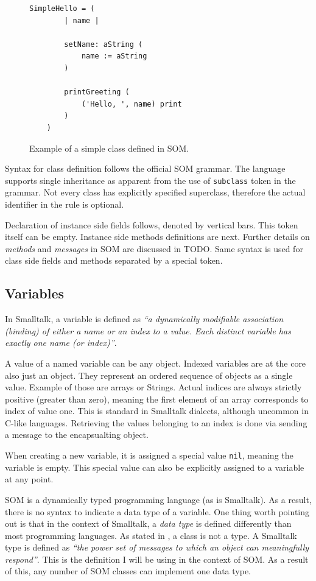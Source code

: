\documentclass[thesis=M,english]{FITthesis}[2019/12/23]
\begin{document}
\begin{figure}[h!]
\begin{lstlisting}[language=Smalltalk]
	SimpleHello = (
		| name |

		setName: aString (
			name := aString
		)

		printGreeting (
			('Hello, ', name) print
		)
	)
\end{lstlisting}
\caption{Example of a simple class defined in SOM.}
\label{fig:hello_example}
\end{figure}

Syntax for class definition follows the official SOM grammar. The language supports single inheritance as apparent from the use
of \texttt{subclass} token in the grammar. Not every class has explicitly specified superclass, therefore the actual identifier in
the rule is optional.

Declaration of instance side fields follows, denoted by vertical bars. This token itself can be empty. Instance side methods definitions
are next. Further details on \textit{methods} and \textit{messages} in SOM are discussed in TODO. %
Same syntax is used for class side fields and methods separated by a special token.

\subsection{Variables}
In Smalltalk, a variable is defined as \textit{``a dynamically modifiable association (binding) of either a name
or an index to a value. Each distinct variable has exactly one name (or index)''}\cite{smalltalk-essentials}.

A value of a named variable can be any object. Indexed variables are at the core also just an object. They
represent an ordered sequence of objects as a single value. Example of those are arrays or Strings. Actual
indices are always strictly positive (greater than zero), meaning the first element of an array corresponds
to index of value one. This is standard in Smalltalk dialects, although uncommon in C-like languages. Retrieving
the values belonging to an index is done via sending a message to the encapsualting object.

When creating a new variable, it is assigned a special value \texttt{nil}, meaning the variable is empty. This
special value can also be explicitly assigned to a variable at any point.

SOM is a dynamically typed programming language (as is Smalltalk). As a result, there is no syntax to indicate
a data type of a variable. One thing worth pointing out is that in the context of Smalltalk, a \textit{data type}
is defined differently than most programming languages. As stated in \cite{smalltalk-essentials}, a class is not
a type. A Smalltalk type is defined as \textit{``the power set of messages to which an object can meaningfully
respond''}\cite{smalltalk-essentials}. This is the definition I will be using in the context of SOM. As a result
of this, any number of SOM classes can implement one data type.
\end{document}
